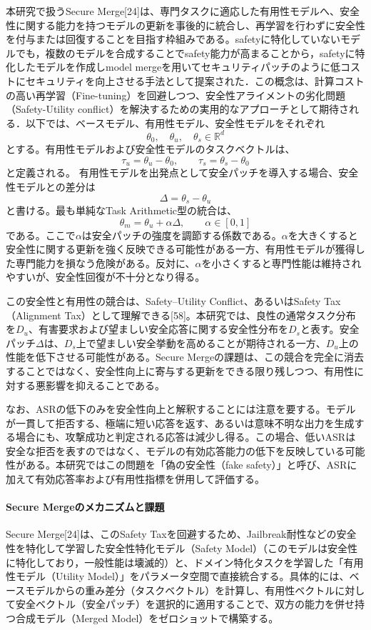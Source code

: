 本研究で扱うSecure Merge[24]は、専門タスクに適応した有用性モデルへ、安全性に関する能力を持つモデルの更新を事後的に統合し、再学習を行わずに安全性を付与または回復することを目指す枠組みである。safetyに特化していないモデルでも，複数のモデルを合成することでsafety能力が高まることから，safetyに特化したモデルを作成しmodel mergeを用いてセキュリティパッチのように低コストにセキュリティを向上させる手法として提案された．この概念は、計算コストの高い再学習（Fine-tuning）を回避しつつ、安全性アライメントの劣化問題（Safety-Utility conflict）を解決するための実用的なアプローチとして期待される．以下では、ベースモデル、有用性モデル、安全性モデルをそれぞれ
\[
\theta_0,\quad \theta_u,\quad \theta_s \in \mathbb{R}^d
\]
とする。有用性モデルおよび安全性モデルのタスクベクトルは、
\[
\tau_u = \theta_u - \theta_0,\qquad
\tau_s = \theta_s - \theta_0
\]
と定義される。
有用性モデルを出発点として安全パッチを導入する場合、安全性モデルとの差分は
\[
\Delta = \theta_s - \theta_u
\]
と書ける。最も単純なTask Arithmetic型の統合は、
\[
\theta_m = \theta_u + \alpha \Delta,\qquad \alpha \in [0,1]
\]
である。ここで\(\alpha\)は安全パッチの強度を調節する係数である。\(\alpha\)を大きくすると安全性に関する更新を強く反映できる可能性がある一方、有用性モデルが獲得した専門能力を損なう危険がある。反対に、\(\alpha\)を小さくすると専門性能は維持されやすいが、安全性回復が不十分となり得る。

この安全性と有用性の競合は、Safety--Utility Conflict、あるいはSafety Tax（Alignment Tax）として理解できる[58]。本研究では、良性の通常タスク分布を\(D_u\)、有害要求および望ましい安全応答に関する安全性分布を\(D_s\)と表す。安全パッチ\(\Delta\)は、\(D_s\)上で望ましい安全挙動を高めることが期待される一方、\(D_u\)上の性能を低下させる可能性がある。Secure Mergeの課題は、この競合を完全に消去することではなく、安全性向上に寄与する更新をできる限り残しつつ、有用性に対する悪影響を抑えることである。

なお、ASRの低下のみを安全性向上と解釈することには注意を要する。モデルが一貫して拒否する、極端に短い応答を返す、あるいは意味不明な出力を生成する場合にも、攻撃成功と判定される応答は減少し得る。この場合、低いASRは安全な拒否を表すのではなく、モデルの有効応答能力の低下を反映している可能性がある。本研究ではこの問題を「偽の安全性（fake safety）」と呼び、ASRに加えて有効応答率および有用性指標を併用して評価する。

\paragraph{Secure Mergeのメカニズムと課題}
Secure Merge[24]は、このSafety Taxを回避するため、Jailbreak耐性などの安全性を特化して学習した安全性特化モデル（Safety Model）（このモデルは安全性に特化しており，一般性能は壊滅的）と、ドメイン特化タスクを学習した「有用性モデル（Utility Model）」をパラメータ空間で直接統合する。具体的には、ベースモデルからの重み差分（タスクベクトル）を計算し、有用性ベクトルに対して安全ベクトル（安全パッチ）を選択的に適用することで、双方の能力を併せ持つ合成モデル（Merged Model）をゼロショットで構築する。

